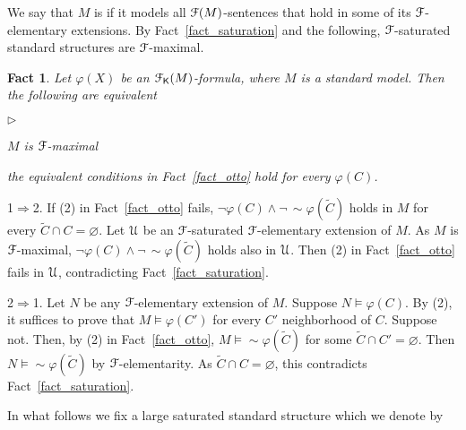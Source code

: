 \documentclass{amsproc}
\makeatletter
\newcommand{\mylabel}[1]{{#1}\hfill}
\renewenvironment{itemize}
  {\begin{list}{$\triangleright$}{%
  \setlength{\parskip}{0mm}
  \setlength{\topsep}{.1\baselineskip}
  \setlength{\rightmargin}{0mm}
  \setlength{\listparindent}{0mm}
  \setlength{\itemindent}{0mm}
  \setlength{\labelwidth}{3ex}
  \setlength{\itemsep}{.1\baselineskip}
  \setlength{\parsep}{.1\baselineskip}
  \setlength{\partopsep}{0mm}
  \setlength{\labelsep}{1ex}
  \setlength{\leftmargin}{\labelwidth+\labelsep}
  \let\makelabel\mylabel}}{%
\end{list}}
\newcounter{thm}
\theoremstyle{mio}
\newtheorem{fact}[thm]{Fact}\tcolorboxenvironment{fact}{mythm}
\providecommand{\proofNameStyle}{\bfseries}
\renewenvironment{proof}[1][\proofname]{\par
  \pushQED{\qed}%
  \normalfont%
  \trivlist
  \item[\hskip\labelsep
        \proofNameStyle
    #1\@addpunct{.}]\ignorespaces
}{%
  \popQED\endtrivlist\@endpefalse
}
\renewcommand*{\emph}[1]{%
   \smash{\tikz[baseline]\node[rectangle, fill=teal!25, rounded corners, inner xsep=0.5ex, inner ysep=0.2ex, anchor=base, minimum height = 2.7ex]{\strut #1};}}
\makeatother
\begin{document}
We say that $M$ is \emph{${\EuScript F}$-maximal\/} if it models all ${\EuScript F}(M)$-sentences that hold in some of its ${\EuScript F}$-elementary extensions.
By Fact~\ref{fact_saturation} and the following, ${\EuScript F}$-saturated standard structures are ${\EuScript F}$-maximal.

\begin{fact}\label{fact_maximal}
  Let $\varphi(X)$ be an ${\EuScript F}_{\sf K}(M)$-formula, where $M$ is a standard model.
  Then the following are equivalent
  \begin{itemize}
    \item [1.] $M$ is ${\EuScript F}$-maximal
    \item [2.] the equivalent conditions in Fact~\ref{fact_otto} hold for every $\varphi(C)$. 
  \end{itemize}
\end{fact}

\begin{proof}
  1$\Rightarrow$2.
  If (2) in Fact~\ref{fact_otto} fails, $\neg\varphi(C)\wedge\neg\,{\sim}\varphi(\tilde C)$ holds in $M$ for every $\tilde C\cap C=\varnothing$.
  Let ${\EuScript U}$ be an ${\EuScript F}$-saturated ${\EuScript F}$-elementary extension of $M$.
  As $M$ is ${\EuScript F}$-maximal, $\neg\varphi(C)\wedge\neg\,{\sim}\varphi(\tilde C)$ holds also in ${\EuScript U}$.
  Then (2) in Fact~\ref{fact_otto} fails in ${\EuScript U}$, contradicting Fact~\ref{fact_saturation}.

  2$\Rightarrow$1. 
  Let $N$ be any ${\EuScript F}$-elementary extension of $M$.
  Suppose $N\models\varphi(C)$.
  By (2), it suffices to prove that $M\models\varphi(C')$ for every $C'$ neighborhood of $C$.
  Suppose not. Then, by (2) in Fact~\ref{fact_otto}, $M\models{\sim}\varphi(\tilde C)$ for some $\tilde C\cap C'=\varnothing$.
  Then $N\models{\sim}\varphi(\tilde C)$ by ${\EuScript F}$-elementarity.
  As $\tilde C\cap C=\varnothing$, this contradicts Fact~\ref{fact_saturation}.
\end{proof}

In what follows we fix a large saturated standard structure which we denote by \emph{${\EuScript U}$.}


\end{document}
